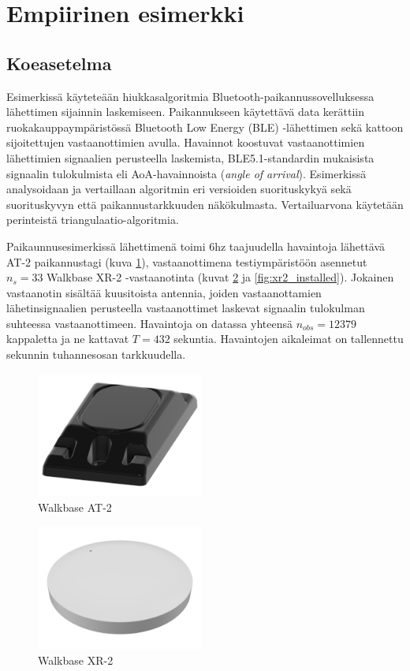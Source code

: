 \documentclass[
  12pt,
  a4paper, twoside]{book}
\begin{document}
\section{Empiirinen esimerkki} \label{empiirinen-esimerkki}

\subsection{Koeasetelma} \label{koeasetelma}

Esimerkissä käyteteään hiukkasalgoritmia Bluetooth-paikannussovelluksessa lähettimen sijainnin laskemiseen. Paikannukseen käytettävä data kerättiin ruokakauppaympäristössä Bluetooth Low Energy (BLE) -lähettimen sekä kattoon sijoitettujen vastaanottimien avulla. Havainnot koostuvat vastaanottimien lähettimien signaalien perusteella laskemista, BLE5.1-standardin mukaisista signaalin tulokulmista eli AoA-havainnoista (\emph{angle of arrival}). Esimerkissä analysoidaan ja vertaillaan algoritmin eri versioiden suorituskykyä sekä suorituskyvyn että paikannustarkkuuden näkökulmasta. Vertailuarvona käytetään perinteistä triangulaatio-algoritmia.

Paikaunnusesimerkissä lähettimenä toimi 6hz taajuudella havaintoja lähettävä AT-2 paikannustagi (kuva \ref{fig:at2}), vastaanottimena testiympäristöön asennetut \(n_s=33\) Walkbase XR-2 -vastaanotinta (kuvat \ref{fig:xr2} ja \ref{fig:xr2_installed}). Jokainen vastaanotin sisältää kuusitoista antennia, joiden vastaanottamien lähetinsignaalien perusteella vastaanottimet laskevat signaalin tulokulman suhteessa vastaanottimeen. Havaintoja on datassa yhteensä \(n_{obs}=12379\) kappaletta ja ne kattavat \(T=432\) sekuntia. Havaintojen aikaleimat on tallennettu sekunnin tuhannesosan tarkkuudella.

\begin{multicols}{2}
\begin{figure}[H]
\centering
\includegraphics[width=5.5cm]{at_2}
\caption{Walkbase AT-2}
\label{fig:at2}
\end{figure}

\begin{figure}[H]
\centering
\includegraphics[width=5.5cm]{xr_2_plain}
\caption{Walkbase XR-2}
\label{fig:xr2}
\end{figure}
\end{multicols}
\end{document}
